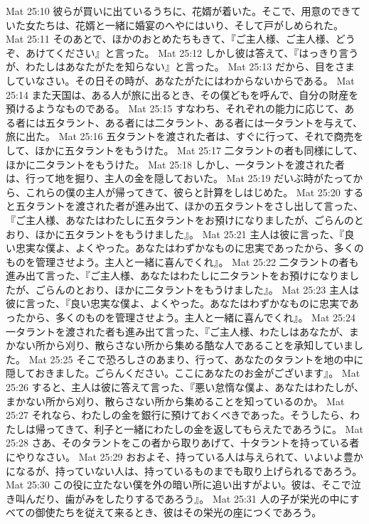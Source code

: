 Mat 25:10  彼らが買いに出ているうちに、花婿が着いた。そこで、用意のできていた女たちは、花婿と一緒に婚宴のへやにはいり、そして戸がしめられた。
Mat 25:11  そのあとで、ほかのおとめたちもきて、『ご主人様、ご主人様、どうぞ、あけてください』と言った。
Mat 25:12  しかし彼は答えて、『はっきり言うが、わたしはあなたがたを知らない』と言った。
Mat 25:13  だから、目をさましていなさい。その日その時が、あなたがたにはわからないからである。
Mat 25:14  また天国は、ある人が旅に出るとき、その僕どもを呼んで、自分の財産を預けるようなものである。
Mat 25:15  すなわち、それぞれの能力に応じて、ある者には五タラント、ある者には二タラント、ある者には一タラントを与えて、旅に出た。
Mat 25:16  五タラントを渡された者は、すぐに行って、それで商売をして、ほかに五タラントをもうけた。
Mat 25:17  二タラントの者も同様にして、ほかに二タラントをもうけた。
Mat 25:18  しかし、一タラントを渡された者は、行って地を掘り、主人の金を隠しておいた。
Mat 25:19  だいぶ時がたってから、これらの僕の主人が帰ってきて、彼らと計算をしはじめた。
Mat 25:20  すると五タラントを渡された者が進み出て、ほかの五タラントをさし出して言った、『ご主人様、あなたはわたしに五タラントをお預けになりましたが、ごらんのとおり、ほかに五タラントをもうけました』。
Mat 25:21  主人は彼に言った、『良い忠実な僕よ、よくやった。あなたはわずかなものに忠実であったから、多くのものを管理させよう。主人と一緒に喜んでくれ』。
Mat 25:22  二タラントの者も進み出て言った、『ご主人様、あなたはわたしに二タラントをお預けになりましたが、ごらんのとおり、ほかに二タラントをもうけました』。
Mat 25:23  主人は彼に言った、『良い忠実な僕よ、よくやった。あなたはわずかなものに忠実であったから、多くのものを管理させよう。主人と一緒に喜んでくれ』。
Mat 25:24  一タラントを渡された者も進み出て言った、『ご主人様、わたしはあなたが、まかない所から刈り、散らさない所から集める酷な人であることを承知していました。
Mat 25:25  そこで恐ろしさのあまり、行って、あなたのタラントを地の中に隠しておきました。ごらんください。ここにあなたのお金がございます』。
Mat 25:26  すると、主人は彼に答えて言った、『悪い怠惰な僕よ、あなたはわたしが、まかない所から刈り、散らさない所から集めることを知っているのか。
Mat 25:27  それなら、わたしの金を銀行に預けておくべきであった。そうしたら、わたしは帰ってきて、利子と一緒にわたしの金を返してもらえたであろうに。
Mat 25:28  さあ、そのタラントをこの者から取りあげて、十タラントを持っている者にやりなさい。
Mat 25:29  おおよそ、持っている人は与えられて、いよいよ豊かになるが、持っていない人は、持っているものまでも取り上げられるであろう。
Mat 25:30  この役に立たない僕を外の暗い所に追い出すがよい。彼は、そこで泣き叫んだり、歯がみをしたりするであろう』。
Mat 25:31  人の子が栄光の中にすべての御使たちを従えて来るとき、彼はその栄光の座につくであろう。
